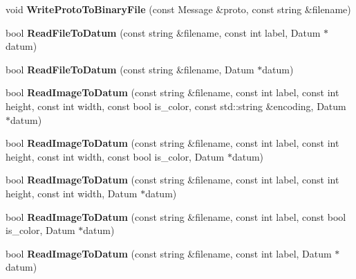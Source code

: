 \begin{DoxyCompactItemize}
\item 
void {\bfseries Write\+Proto\+To\+Binary\+File} (const Message \&proto, const string \&filename)\hypertarget{namespacecaffe_a982f1288dee62760b6599c0948652d6d}{}\label{namespacecaffe_a982f1288dee62760b6599c0948652d6d}

\item 
bool {\bfseries Read\+File\+To\+Datum} (const string \&filename, const int label, Datum $\ast$datum)\hypertarget{namespacecaffe_aca018a80990483d13e0dfcf50a606d4e}{}\label{namespacecaffe_aca018a80990483d13e0dfcf50a606d4e}

\item 
bool {\bfseries Read\+File\+To\+Datum} (const string \&filename, Datum $\ast$datum)\hypertarget{namespacecaffe_aa61a3accf826d8c50fe3065ea7e92da3}{}\label{namespacecaffe_aa61a3accf826d8c50fe3065ea7e92da3}

\item 
bool {\bfseries Read\+Image\+To\+Datum} (const string \&filename, const int label, const int height, const int width, const bool is\+\_\+color, const std\+::string \&encoding, Datum $\ast$datum)\hypertarget{namespacecaffe_ac4005de198b4d9847b1e134c3de69101}{}\label{namespacecaffe_ac4005de198b4d9847b1e134c3de69101}

\item 
bool {\bfseries Read\+Image\+To\+Datum} (const string \&filename, const int label, const int height, const int width, const bool is\+\_\+color, Datum $\ast$datum)\hypertarget{namespacecaffe_a4aed8828c71f073b318d44e3b5add943}{}\label{namespacecaffe_a4aed8828c71f073b318d44e3b5add943}

\item 
bool {\bfseries Read\+Image\+To\+Datum} (const string \&filename, const int label, const int height, const int width, Datum $\ast$datum)\hypertarget{namespacecaffe_a8ff5217644f29055cdd8ded8d967af28}{}\label{namespacecaffe_a8ff5217644f29055cdd8ded8d967af28}

\item 
bool {\bfseries Read\+Image\+To\+Datum} (const string \&filename, const int label, const bool is\+\_\+color, Datum $\ast$datum)\hypertarget{namespacecaffe_acae2bc23e040dc50620e5215ec04d25b}{}\label{namespacecaffe_acae2bc23e040dc50620e5215ec04d25b}

\item 
bool {\bfseries Read\+Image\+To\+Datum} (const string \&filename, const int label, Datum $\ast$datum)\hypertarget{namespacecaffe_a1004c0112552987ac24bb5b0b1de2116}{}\label{namespacecaffe_a1004c0112552987ac24bb5b0b1de2116}


\end{DoxyCompactItemize}
